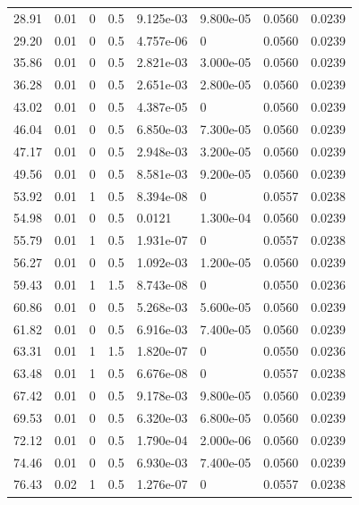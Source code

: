 \documentclass[preview]{standalone}
\begin{document}
{{\begin{tabular}{L{1.2cm}C{1.2cm} C{0.3cm}C{0.5cm} C{1.4cm}C{1.4cm} C{1.4cm}C{1.4cm}}
  28.91  &  0.01  & 0     & 0.5 &  9.125e-03  & 9.800e-05  & 0.0560 &  0.0239   \\ 
  29.20  &  0.01  & 0     & 0.5 &  4.757e-06  & 0  & 0.0560 &  0.0239   \\ 
  35.86  &  0.01  & 0     & 0.5 &  2.821e-03  & 3.000e-05  & 0.0560 &  0.0239   \\ 
  36.28  &  0.01  & 0     & 0.5 &  2.651e-03  & 2.800e-05  & 0.0560 &  0.0239   \\ 
  43.02  &  0.01  & 0     & 0.5 &  4.387e-05  & 0  & 0.0560 &  0.0239   \\ 
  46.04  &  0.01  & 0     & 0.5 &  6.850e-03  & 7.300e-05  & 0.0560 &  0.0239   \\ 
  47.17  &  0.01  & 0     & 0.5 &  2.948e-03  & 3.200e-05  & 0.0560 &  0.0239   \\ 
  49.56  &  0.01  & 0     & 0.5 &  8.581e-03  & 9.200e-05  & 0.0560 &  0.0239   \\ 
  53.92  &  0.01  & 1     & 0.5 &  8.394e-08  & 0  & 0.0557 &  0.0238   \\ 
  54.98  &  0.01  & 0     & 0.5 &  0.0121  & 1.300e-04  & 0.0560 &  0.0239   \\ 
  55.79  &  0.01  & 1     & 0.5 &  1.931e-07  & 0  & 0.0557 &  0.0238   \\ 
  56.27  &  0.01  & 0     & 0.5 &  1.092e-03  & 1.200e-05  & 0.0560 &  0.0239   \\ 
  59.43  &  0.01  & 1     & 1.5 &  8.743e-08  & 0  & 0.0550 &  0.0236   \\ 
  60.86  &  0.01  & 0     & 0.5 &  5.268e-03  & 5.600e-05  & 0.0560 &  0.0239   \\ 
  61.82  &  0.01  & 0     & 0.5 &  6.916e-03  & 7.400e-05  & 0.0560 &  0.0239   \\ 
  63.31  &  0.01  & 1     & 1.5 &  1.820e-07  & 0  & 0.0550 &  0.0236   \\ 
  63.48  &  0.01  & 1     & 0.5 &  6.676e-08  & 0  & 0.0557 &  0.0238   \\ 
  67.42  &  0.01  & 0     & 0.5 &  9.178e-03  & 9.800e-05  & 0.0560 &  0.0239   \\ 
  69.53  &  0.01  & 0     & 0.5 &  6.320e-03  & 6.800e-05  & 0.0560 &  0.0239   \\ 
  72.12  &  0.01  & 0     & 0.5 &  1.790e-04  & 2.000e-06  & 0.0560 &  0.0239   \\ 
  74.46  &  0.01  & 0     & 0.5 &  6.930e-03  & 7.400e-05  & 0.0560 &  0.0239   \\ 
  76.43  &  0.02  & 1     & 0.5 &  1.276e-07  & 0  & 0.0557 &  0.0238   \\ 

\end{tabular}}}
\end{document}

